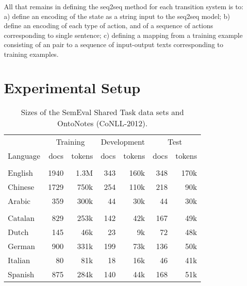 \documentclass[11pt,a4paper]{article}
\begin{document}
All that remains in defining the seq2seq method for each transition system is to: a) define an encoding of the state  as a string input to the seq2seq model; b) define an encoding of each type of action, and of a sequence of actions corresponding to single sentence; c) defining a mapping from a training example consisting of an  pair to a sequence of input-output texts corresponding to training examples. 
%
 

\section{Experimental Setup}
\label{sec:experiments}


\begin{table}
\centering
\small
\setlength{\tabcolsep}{3.0pt}
\begin{tabular}{l|rr|rr|rr}
& \multicolumn{2}{c|}{Training} & \multicolumn{2}{c|}{Development} & \multicolumn{2}{c}{Test} \\
Language & docs & tokens & docs & tokens & docs & tokens  \\ \hline
\rowcolor{Gray}
\multicolumn{7}{c}{\bf OntoNotes / CoNLL-2012 datasets} \\ 
English & 1940 & 1.3M & 343 & 160k & 348 & 170k   \\
Chinese & 1729 & 750k & 254 & 110k & 218 & 90k\\
Arabic & 359 & 300k & 44 & 30k & 44 & 30k \\ \hline
\rowcolor{Gray}
\multicolumn{7}{c}{\bf SemEval 2010 data} \\
Catalan  & 829  & 253k   & 142& 42k & 167  & 49k\\
Dutch    & 145  & 46k    & 23 & 9k &72 & 48k \\
German   & 900  & 331k   & 199   & 73k &136 & 50k \\
Italian  & 80  &   81k   & 18    & 16k& 46 & 41k \\
Spanish  & 875 & 284k    &140    & 44k& 168 & 51k
\end{tabular}

\caption{\label{tab:datasets} Sizes of the SemEval Shared Task data sets and OntoNotes (CoNLL-2012). }

\end{table}
\end{document}
